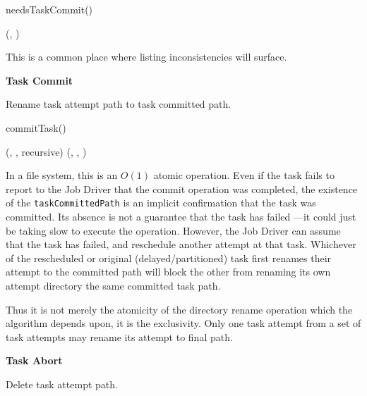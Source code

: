 \documentclass[conference]{IEEEtran}
\begin{document}
\begin{function}
\caption{needsTaskCommit()}


\exists(\fs, \taskAttemptPath)\;
\end{function}

This is a common place where listing inconsistencies will surface.


\textbf{Task Commit}

Rename task attempt path to task committed path.

\begin{procedure}
\caption{commitTask()}

\If{\exists(\fs, \taskAttemptPath)} {
  \delete(\fs, \taskCommittedPath, recursive)\;
  \rename(\fs, \taskAttemptPath, \taskCommittedPath)\;
}
\end{procedure}


In a file system, this is an $O(1)$ atomic operation.
Even if the task fails to report to the Job Driver that the
commit operation was completed, the existence of the \texttt{taskCommittedPath}
is an implicit confirmation that the task was committed.
Its absence is not a guarantee that the task has failed ---it could just
be taking slow to execute the operation.
However, the Job Driver can assume that the task has failed,
and reschedule another attempt at that task.
Whichever of the rescheduled or original (delayed/partitioned) task
first renames their attempt to the committed path will block the other
from renaming its own attempt directory the same committed task path.

Thus it is not merely the atomicity of the directory rename operation
which the algorithm depends upon, it is the exclusivity.
Only one task attempt from a set of task attempts may rename its attempt to
final path.

\textbf{Task Abort}

Delete task attempt path.
\end{document}
